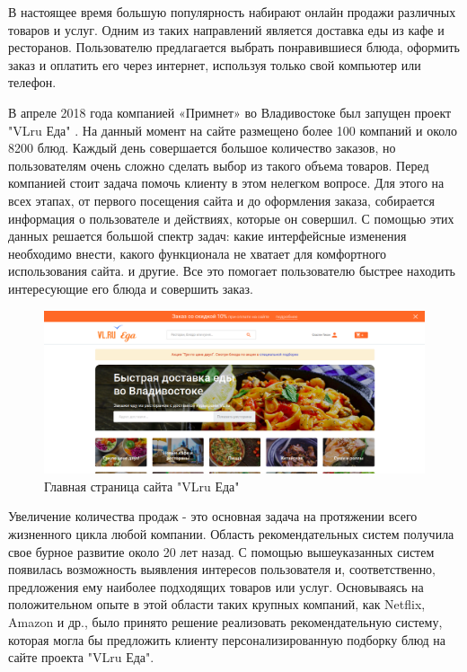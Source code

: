 В настоящее время большую популярность набирают онлайн продажи различных товаров
и услуг. Одним из таких направлений является доставка еды из кафе и ресторанов.
Пользователю предлагается выбрать понравившиеся блюда, оформить заказ и оплатить
его через интернет, используя только свой компьютер или телефон.

В апреле 2018 года компанией «Примнет» во Владивостоке был запущен проект "VLru Еда" \cite{VLruEda}.
На данный момент на сайте размещено более 100 компаний и около 8200 блюд. Каждый
день совершается большое количество заказов, но пользователям очень сложно сделать
выбор из такого объема товаров. Перед компанией стоит задача помочь клиенту в этом
нелегком вопросе. Для этого на всех этапах, от первого посещения сайта и до
оформления заказа, собирается информация о пользователе и действиях, которые он
совершил. С помощью этих данных решается большой спектр задач: какие интерфейсные
изменения необходимо внести, какого функционала не хватает для комфортного
использования сайта. и другие. Все это помогает пользователю быстрее находить интересующие
его блюда и совершить заказ.
\begin{figure}[H]
    \centering
    \includegraphics[scale=0.3]{images/main_page.png}
    \caption{Главная страница сайта "VLru Еда"}
\end{figure}

Увеличение количества продаж - это основная задача на протяжении всего жизненного
цикла любой компании. Область рекомендательных систем получила свое бурное развитие
около 20 лет назад. С помощью вышеуказанных систем появилась возможность выявления
интересов пользователя и, соответственно, предложения ему наиболее подходящих
товаров или услуг. Основываясь на положительном опыте в этой области таких крупных
компаний, как Netflix, Amazon и др., было принято решение реализовать рекомендательную
систему, которая могла бы предложить клиенту персонализированную подборку блюд на
сайте проекта "VLru Еда".
